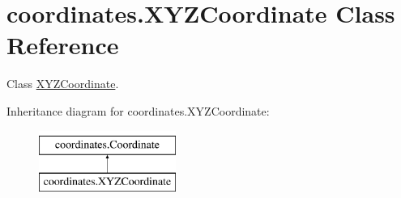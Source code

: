 \hypertarget{classcoordinates_1_1_x_y_z_coordinate}{}\section{coordinates.\+X\+Y\+Z\+Coordinate Class Reference}
\label{classcoordinates_1_1_x_y_z_coordinate}


Class \hyperlink{classcoordinates_1_1_x_y_z_coordinate}{X\+Y\+Z\+Coordinate}.  


Inheritance diagram for coordinates.\+X\+Y\+Z\+Coordinate\+:\begin{figure}[H]
\begin{center}
\leavevmode
\includegraphics[height=2.000000cm]{classcoordinates_1_1_x_y_z_coordinate}
\end{center}
\end{figure}
